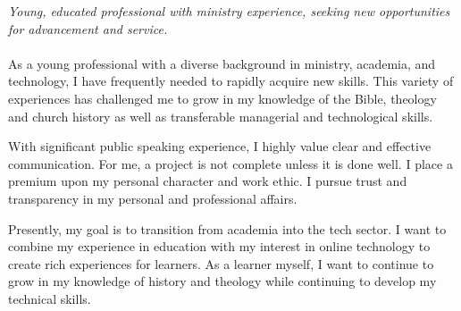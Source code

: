 
\vspace{-1.3em} %

\begin{multicols}{2}  %
\noindent \textit{Young, educated professional with ministry experience, seeking new opportunities for advancement and service.}\\\\

As a young professional with a diverse background in ministry, academia, and technology, I have frequently needed to rapidly acquire new skills. This variety of experiences has challenged me to grow in my knowledge of the Bible, theology and church history as well as transferable managerial and technological skills.

With significant public speaking experience, I highly value clear and effective communication. For me, a project is not complete unless it is done well. I place a premium upon my personal character and work ethic. I pursue trust and transparency in my personal and professional affairs.

Presently, my goal is to transition from academia into the tech sector. I want to combine my experience in education with my interest in online technology to create rich experiences for learners. As a learner myself, I want to continue to grow in my knowledge of history and theology while continuing to develop my technical skills.

\end{multicols}

